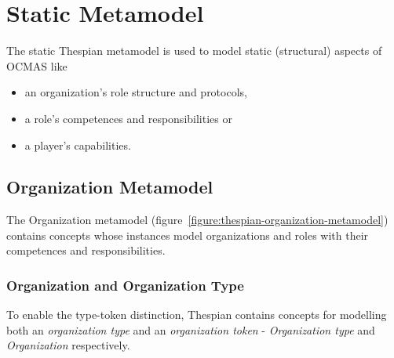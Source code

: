 
\section{Static Metamodel}

The static Thespian metamodel is used to model static (structural) aspects of OCMAS like
\begin{itemize}
	\item an organization's role structure and protocols,
	\item a role's competences and responsibilities or
	\item a player's capabilities.
\end{itemize}

\subsection{Organization Metamodel}

The Organization metamodel (figure~\ref{figure:thespian-organization-metamodel}) contains concepts whose instances model organizations and roles with their competences and responsibilities.

\subsubsection*{Organization and Organization Type}

To enable the type-token distinction, Thespian contains concepts for modelling both an \textit{organization type} and an \textit{organization token} - \textit{Organization type} and \textit{Organization} respectively.

